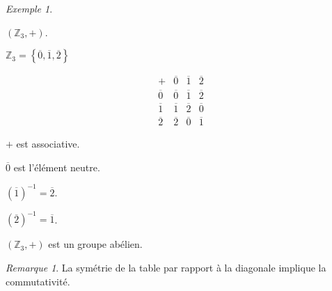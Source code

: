 \documentclass{report}
\newcommand*{\entiers}{\mathbb{Z}}
\theoremstyle{definition}
\theoremstyle{remark}
\newtheorem*{exem}{Exemple}
\newtheorem*{rema}{Remarque}
\begin{document}
	\begin{exem}
		~

		$\left( \entiers_3,+ \right)$.

		$\entiers_3=\left\lbrace \overline{0}, \overline{1}, \overline{2} \right\rbrace$

		\renewcommand{\arraystretch}{1.5}
		\[
		\begin{array}{c||c|c|c}
			+&\overline0&\overline1&\overline2\\
			\hline\hline
			\overline0&\overline0&\overline1&\overline2\\
			\hline
			\overline1&\overline1&\overline2&\overline0\\
			\hline
			\overline2&\overline2&\overline0&\overline1
		\end{array}
		\]
		\renewcommand{\arraystretch}{1}

		$+$ est associative.

		$\overline{0}$ est l'\'el\'ement neutre.

		$(\overline{1})^{-1}=\overline{2}$.

		$(\overline{2})^{-1}=\overline{1}$.

		$\left( \entiers_3,+ \right)$ est un groupe ab\'elien.
		\begin{rema}
			La sym\'etrie de la table par rapport \`a la diagonale implique la commutativit\'e.
		\end{rema}
	\end{exem}
\end{document}
